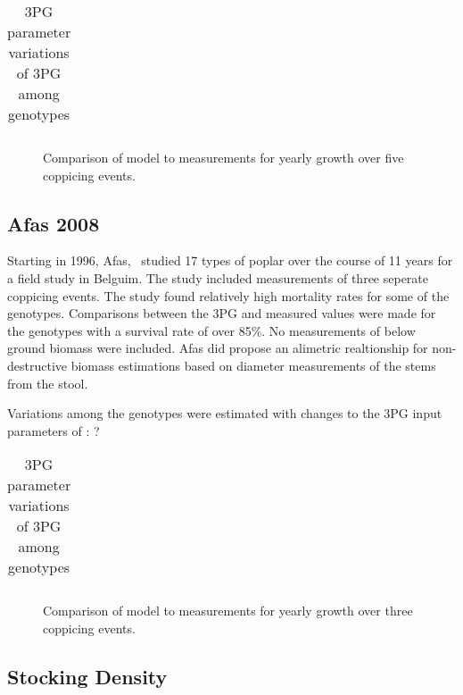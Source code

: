 \documentclass[10pt]{article}
\begin{document}
\begin{table}[!ht]
  \centering
  \begin{tabular}{}
    
  \end{tabular}
  \caption{3PG parameter variations of 3PG among genotypes}
  \label{tab:pont-3pg}
\end{table}

\begin{figure}[!ht]
  \centering

  \caption{Comparison of model to measurements for yearly growth over five
    coppicing events.}
\label{fig:pont-biomass}
\end{figure}


\subsection{Afas 2008}
\label{Afas2008}

Starting in 1996, Afas,~\cite{Afas2008a} studied 17 types of poplar
over the course of 11 years for a field study in Belguim.  The study
included measurements of three seperate coppicing events.  The study
found relatively high mortality rates for some of the genotypes.
Comparisons between the 3PG and measured values were made for the
genotypes with a survival rate of over 85\%.  No measurements of below
ground biomass were included.  Afas did propose an alimetric
realtionship for non-destructive biomass estimations based on diameter
measurements of the stems from the stool.

Variations among the genotypes were estimated with changes to the 3PG
input parameters of : ?

\begin{table}[!ht]
  \centering
  \begin{tabular}{}
    
  \end{tabular}
  \caption{3PG parameter variations of 3PG among genotypes}
  \label{tab:afas-3pg}
\end{table}

\begin{figure}[!ht]
  \centering

  \caption{Comparison of model to measurements for yearly growth over three
    coppicing events.}
\label{fig:afas-biomass}
\end{figure}

\subsection*{Stocking Density}
\label{sec:stocking-density}
\end{document}
